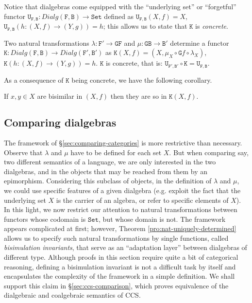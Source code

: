 \documentclass[orivec]{llncs}
\newcommand{\mC}[1]{\mathtt{#1}}
\newcommand{\mF}[1]{\mathtt{#1}}
\newcommand{\Set}{\mC{Set}}
\newcommand{\F}{\mF{F}}
\newcommand{\G}{\mF{G}}
\newcommand{\B}{\mF{B}}
\newcommand{\U}{\mF{U}}
\newcommand{\K}{\mF{K}}
\newcommand{\dialg}{\mathit{Dialg}}
\newcommand{\defend}{}
\renewenvironment{theorem}{\begin{thm}}{\defend\end{thm}}
\renewenvironment{corollary}{\begin{cor}}{\defend\end{cor}}
\begin{document}
Notice that dialgebras come equipped with the ``underlying set'' or ``forgetful'' functor $\U_{\F,\B} : \dialg(\F,\B) \to \Set$ defined as $\U_{\F,\B}(X,f) = X$, $\U_{\F,\B}(h : (X,f) \to (Y,g)) = h$; this allows us to state that $\K$ is \emph{concrete}.

\begin{theorem}{\label{thm:general-comparisons}}
	Two natural transformations $\lambda : \F' \to \G \F$ and $\mu : \G \B \to \B'$ determine a functor $\K: \dialg(\F,\B)\to \dialg(\F',\B')$ as $\K(X,f) = (X,\mu_X \circ \G f \circ \lambda_X)$, $\K(h : (X,f) \to (Y,g)) = h$. $\K$ is concrete, that is: $\U_{\F',\B'} \circ \K = \U_{\F,\B}$. 
\end{theorem}	
	
As a consequence of $\K$ being concrete, we have the following corollary.

\begin{corollary}
	If $x,y\in X$ are bisimilar in $(X,f)$ then they are so in $\K(X,f)$.
\end{corollary}

\subsection{Comparing dialgebras}
\label{sec:specific-comparisons}

The framework of \S \ref{sec:comparing-categories} is more restrictive than necessary. Observe that $\lambda$ and $\mu$ have to be defined for each set $X$. But when comparing say, two different semantics of a language, we are only interested in the two dialgebras, and in the objects that may be reached from them by an epimorphism. Considering this subclass of objects, in the definition of $\lambda$ and $\mu$, we could use specific features of a given dialgebra (e.g. exploit the fact that the underlying set $X$ is the carrier of an algebra, or refer to specific elements of $X$).
In this light, we now restrict our attention to natural transformations between functors whose codomain is $\Set$, but whose domain is not. The framework appears complicated at first; however, Theorem \ref{pro:nat-uniquely-determined} allows us to specify such natural transformations by single functions, called \emph{bisimulation invariants}, that serve as an ``adaptation layer'' between dialgebras of different type.
Although proofs in this section require quite a bit of categorical reasoning, defining a bisimulation invariant is not a difficult task by itself and encapsulates the complexity of the framework in a simple definition. We shall support this claim in \S \ref{sec:ccs-comparison}, which proves equivalence of the dialgebraic and coalgebraic semantics of CCS. 
\end{document}
